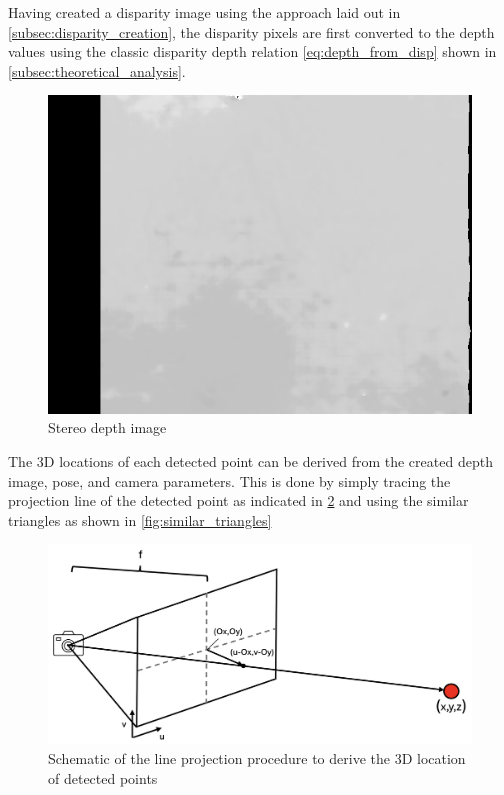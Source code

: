 Having created a disparity image using the approach laid out in \cref{subsec:disparity_creation}, the disparity pixels are first converted to the depth values using the classic disparity depth relation \ref{eq:depth_from_disp} shown in \cref{subsec:theoretical_analysis}.

\begin{figure}[h]
\centering
\includegraphics[scale=0.5]{images/stereo_camera_depth/stereo_depth.png}
\caption{Stereo depth image}
\label{fig:stereo_depth}
\end{figure}

The 3D locations of each detected point can be derived from the created depth image, pose, and camera parameters. This is done by simply tracing the projection line of the detected point as indicated in \cref{fig:line_projection} and using the similar triangles as shown in \cref{fig:similar_triangles}

\begin{figure}[h]
\centering
\includegraphics[scale=0.25]{images/stereo_camera_depth/projection.png}
\caption{Schematic of the line projection procedure to derive the 3D location of detected points}
\label{fig:line_projection}
\end{figure}

